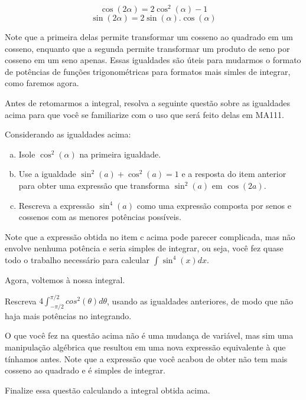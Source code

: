 \documentclass[main_estudante.tex]{subfiles}
\begin{document}
\begin{shaded*}
$$\cos(2\alpha) = 2\cos^2(\alpha)-1$$
$$\sin(2\alpha) = 2\sin(\alpha).\cos(\alpha)$$
\end{shaded*}

Note que a primeira delas permite transformar um cosseno ao quadrado em um cosseno, enquanto que a segunda permite transformar um produto de seno por cosseno em um seno apenas. Essas igualdades são úteis para mudarmos o formato de potências de funções trigonométricas para formatos mais simles de integrar, como faremos agora.

Antes de retomarmos a integral, resolva a seguinte questão sobre as igualdades acima para que você se familiarize com o uso que será feito delas em MA111.

\begin{questao}
Considerando as igualdades acima:
\begin{enumerate}[a)]
\item Isole $\cos^2(\alpha)$ na primeira igualdade.
\item Use a igualdade $\sin^2(a) + \cos^2(a)=1$ e a resposta do item anterior para obter uma expressão que transforma $\sin^2(a)$ em $\cos(2a)$.
\item Rescreva a expressão $\sin^4(a)$ como uma expressão composta por senos e cossenos com as menores potências possíveis.
\end{enumerate}
\end{questao}

Note que a expressão obtida no item c acima pode parecer complicada, mas não envolve nenhuma potência e seria simples de integrar, ou seja, você fez quase todo o trabalho necessário para calcular $\int \sin^4(x)dx$.

Agora, voltemos à nossa integral.

\begin{questao}
Rescreva $4\int_{-\pi/2}^{\pi/2} cos^2(\theta)d\theta$, usando as igualdades anteriores, de modo que não haja mais potências no integrando.
\end{questao}

O que você fez na questão acima não é uma mudança de variável, mas sim uma manipulação algébrica que resultou em uma nova expressão equivalente à que tínhamos antes. Note que a expressão que você acabou de obter não tem mais cosseno ao quadrado e é simples de integrar.

\begin{questao}
Finalize essa questão calculando a integral obtida acima.
\end{questao}
\end{document}
